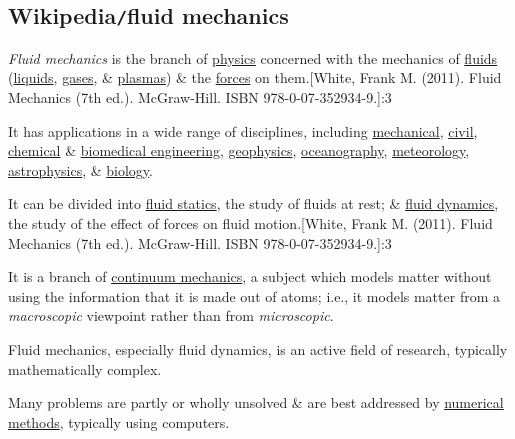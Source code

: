 \documentclass{article}
\begin{document}

\subsection{Wikipedia{\tt/}fluid mechanics}
\textit{Fluid mechanics} is the branch of \href{https://en.wikipedia.org/wiki/Physics}{physics} concerned with the mechanics of \href{https://en.wikipedia.org/wiki/Fluid}{fluids} (\href{https://en.wikipedia.org/wiki/Liquid}{liquids}, \href{https://en.wikipedia.org/wiki/Gas}{gases}, \& \href{https://en.wikipedia.org/wiki/Plasma_(physics)}{plasmas}) \& the \href{https://en.wikipedia.org/wiki/Force}{forces} on them.[White, Frank M. (2011). Fluid Mechanics (7th ed.). McGraw-Hill. ISBN 978-0-07-352934-9.]:3

It has applications in a wide range of disciplines, including \href{https://en.wikipedia.org/wiki/Mechanical_engineering}{mechanical}, \href{https://en.wikipedia.org/wiki/Civil_engineering}{civil}, \href{https://en.wikipedia.org/wiki/Chemical_engineering}{chemical} \& \href{https://en.wikipedia.org/wiki/Biomedical_engineering}{biomedical engineering}, \href{https://en.wikipedia.org/wiki/Geophysics}{geophysics}, \href{https://en.wikipedia.org/wiki/Oceanography}{oceanography}, \href{https://en.wikipedia.org/wiki/Meteorology}{meteorology}, \href{https://en.wikipedia.org/wiki/Astrophysics}{astrophysics}, \& \href{https://en.wikipedia.org/wiki/Biology}{biology}.

%
It can be divided into \href{https://en.wikipedia.org/wiki/Fluid_statics}{fluid statics}, the study of fluids at rest; \& \href{https://en.wikipedia.org/wiki/Fluid_dynamics}{fluid dynamics}, the study of the effect of forces on fluid motion.[White, Frank M. (2011). Fluid Mechanics (7th ed.). McGraw-Hill. ISBN 978-0-07-352934-9.]:3

It is a branch of \href{https://en.wikipedia.org/wiki/Continuum_mechanics}{continuum mechanics}, a subject which models matter without using the information that it is made out of atoms; i.e., it models matter from a \textit{macroscopic} viewpoint rather than from \textit{microscopic}.

Fluid mechanics, especially fluid dynamics, is an active field of research, typically mathematically complex.

Many problems are partly or wholly unsolved \& are best addressed by \href{https://en.wikipedia.org/wiki/Numerical_methods}{numerical methods}, typically using computers.
\end{document}

